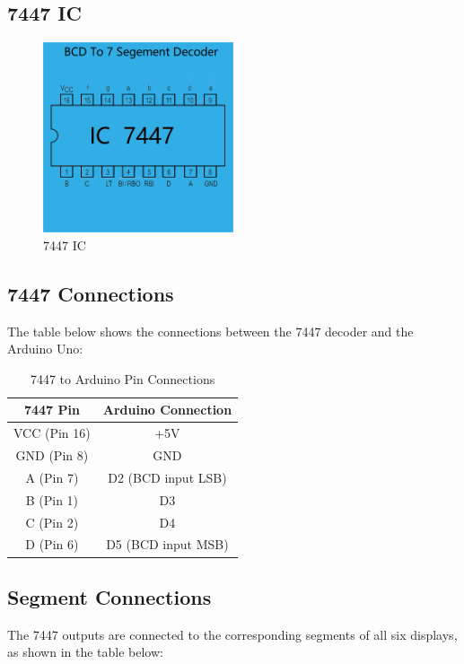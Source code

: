 \documentclass[journal]{IEEEtran}
\begin{document}
\subsection{7447 IC}
\begin{figure}[h]
    \centering
    \includegraphics[width=0.5\textwidth]{figs/2.png} %
    \caption{7447 IC}
    
\end{figure}
\subsection{7447 Connections}
The table below shows the connections between the 7447 decoder and the Arduino Uno:

\begin{table}[H]
    \centering
    \caption{7447 to Arduino Pin Connections}
    \begin{tabular}{|c|c|}
        \hline
        \textbf{7447 Pin} & \textbf{Arduino Connection} \\
        \hline
        VCC (Pin 16) & +5V \\
        GND (Pin 8) & GND \\
        A (Pin 7) & D2 (BCD input LSB) \\
        B (Pin 1) & D3 \\
        C (Pin 2) & D4 \\
        D (Pin 6) & D5 (BCD input MSB) \\
        \hline
    \end{tabular}
\end{table}
\subsection{Segment Connections}
The 7447 outputs are connected to the corresponding segments of all six displays, as shown in the table below:
\end{document}
